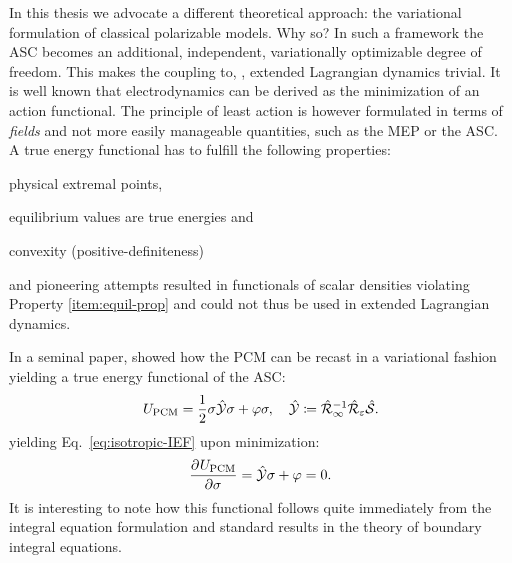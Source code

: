In this thesis we advocate a different theoretical approach: the
variational formulation of classical polarizable models.
Why so? In such a framework the \acrshort{ASC} becomes an additional,
independent, variationally optimizable degree of freedom.
This makes the coupling to, \eg, extended Lagrangian dynamics
trivial.\autocite{Car1985-jw}
It is well known that electrodynamics can be derived as the minimization
of an action functional.\autocite{Jackson1999}
The principle of least action is however formulated in terms of
\emph{fields} and not more easily manageable quantities, such as the
\acrshort{MEP} or the \acrshort{ASC}.
A true energy functional has to fulfill the following
properties:\autocite{Solis2013-ef}
\begin{enumerate*}[label={\alph*)},font={\color{PMS1797}}]
    \item physical extremal points,
    \item equilibrium values are true energies \label{item:equil-prop} and
    \item convexity (positive-definiteness)
\end{enumerate*}
\citeauthor{Allen2001-fp} and \citeauthor{Attard2003-vr} pioneering
attempts resulted in functionals of scalar densities violating
Property \ref{item:equil-prop} and could not thus be used in extended Lagrangian
dynamics.\autocite{Allen2001-fp, Attard2003-vr, Attard2007-lk}

In a seminal paper, \citeauthor{Lipparini2010-be} showed how the
\acrshort{PCM} can be recast in a variational fashion yielding a true energy
functional of the \acrshort{ASC}:\autocite{Lipparini2010-be, Lipparini2011-aj, Lipparini2016-mo}
\begin{equation}\label{eq:pcm-functional}
 U_\mathrm{PCM} = \frac{1}{2}\sigma\hat{\mathcal{Y}}\sigma + \varphi\sigma,
 \quad
  \hat{\mathcal{Y}} \coloneq \hat{\mathcal{R}}_\infty^{-1}\hat{\mathcal{R}}_\varepsilon\hat{\mathcal{S}}.
\end{equation}
yielding Eq.~\eqref{eq:isotropic-IEF} upon minimization:
\begin{equation}\label{eq:pcm-stationarity}
  \frac{\partial^{}U_\mathrm{PCM}} {\partial \sigma^{}} = \hat{\mathcal{Y}}\sigma + \varphi = 0.
\end{equation}
It is interesting to note how this functional follows quite immediately
from the integral equation formulation and standard results in the
theory of boundary integral equations.\autocite{Hsiao2008-xb}

